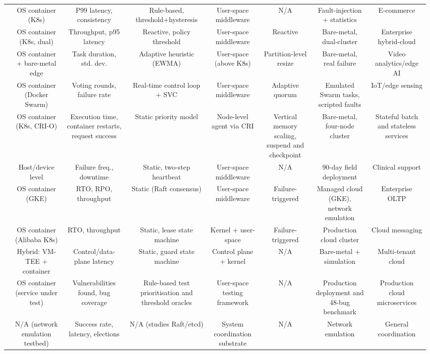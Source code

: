 \documentclass[10pt]{article}
\begin{document}
\begin{table}[t]
{\begin{tabular}{@{}lccccccc@{}}
\cite{chen2026distributed} & OS container (K8s) & P99 latency, consistency & Rule-based, threshold+hysteresis & User-space middleware & N/A & Fault-injection + statistics & E-commerce \\
\cite{bongu2026middleware} & OS container (K8s, dual) & Throughput, p95 latency & Reactive, policy threshold & User-space middleware & Reactive & Bare-metal, dual-cluster & Enterprise hybrid-cloud \\
\cite{kwon2026erpf} & OS container + bare-metal edge & Task duration, std. dev. & Adaptive heuristic (EWMA) & User-space (above K8s) & Partition-level resize & Bare-metal, real failure & Video analytics/edge AI \\
\cite{javens2026adaptive} & OS container (Docker Swarm) & Voting rounds, failure rate & Real-time control loop + SVC & User-space middleware & Adaptive quorum & Emulated Swarm tasks, scripted faults & IoT/edge sensing \\
\cite{kang2026evmm} & OS container (K8s, CRI-O) & Execution time, container restarts, request success & Static priority model & Node-level agent via CRI & Vertical memory scaling, suspend and checkpoint & Bare-metal, four-node cluster & Stateful batch and stateless services \\
\cite{naim2026doublecheck} & Host/device level & Failure freq., downtime & Static, two-step heartbeat & User-space middleware & N/A & 90-day field deployment & Clinical support \\
\cite{jerrari2026ha} & OS container (GKE) & RTO, RPO, throughput & Static (Raft consensus) & User-space middleware & Failure-triggered & Managed cloud (GKE), network emulation & Enterprise OLTP \\
\cite{jin2026replicationfree} & OS container (Alibaba K8s) & RTO, throughput & Static, lease state machine & Kernel + user-space & Failure-triggered & Production cloud cluster & Cloud messaging \\
\cite{li2026pyramid} & Hybrid: VM-TEE + container & Control/data-plane latency & Static, guard state machine & Control plane + kernel & N/A & Bare-metal + simulation & Multi-tenant cloud \\
\cite{chen2026cast} & OS container (service under test) & Vulnerabilities found, bug coverage & Rule-based test prioritisation and threshold oracles & User-space testing framework & N/A & Production deployment and 48-bug benchmark & Production cloud microservices \\
\cite{jensen2021raft} & N/A (network emulation testbed) & Success rate, latency, elections & N/A (studies Raft/etcd) & System coordination substrate & N/A & Network emulation & General coordination \\

\end{tabular}}
\end{table}
\end{document}

